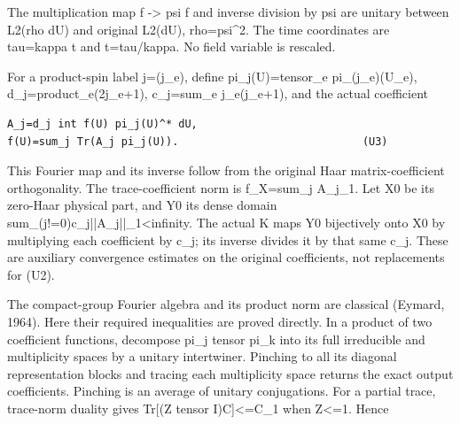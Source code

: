 \documentclass[11pt,a4paper]{article}
\renewcommand{\[}{\begingroup\small\originaldisplaystart}
\renewcommand{\]}{\originaldisplayend\endgroup}
\begin{document}
The multiplication map f -\textgreater{} psi f and inverse division by
psi are unitary between L2(rho dU) and original L2(dU), rho=psi\^{}2.
The time coordinates are tau=kappa t and t=tau/kappa. No field variable
is rescaled.

For a product-spin label j=(j\_e), define pi\_j(U)=tensor\_e
pi\_(j\_e)(U\_e),
{d\allowbreak{}\_\allowbreak{}j\allowbreak{}=\allowbreak{}p\allowbreak{}r\allowbreak{}o\allowbreak{}d\allowbreak{}u\allowbreak{}c\allowbreak{}t\allowbreak{}\_\allowbreak{}e\allowbreak{}(\allowbreak{}2\allowbreak{}j\allowbreak{}\_\allowbreak{}e\allowbreak{}+\allowbreak{}1\allowbreak{})\allowbreak{},\allowbreak{}}
c\_j=sum\_e j\_e(j\_e+1), and the actual coefficient

\begin{verbatim}
A_j=d_j int f(U) pi_j(U)^* dU,
f(U)=sum_j Tr(A_j pi_j(U)).                             (U3)
\end{verbatim}

This Fourier map and its inverse follow from the original Haar
matrix-coefficient orthogonality. The trace-coefficient norm is
\textbar\textbar f\textbar\textbar\_X=sum\_j
\textbar\textbar A\_j\textbar\textbar\_1. Let X0 be its zero-Haar
physical part, and Y0 its dense domain
{s\allowbreak{}u\allowbreak{}m\allowbreak{}\_\allowbreak{}(\allowbreak{}j\allowbreak{}!\allowbreak{}=\allowbreak{}0\allowbreak{})\allowbreak{}c\allowbreak{}\_\allowbreak{}j\allowbreak{}|\allowbreak{}|\allowbreak{}A\allowbreak{}\_\allowbreak{}j\allowbreak{}|\allowbreak{}|\allowbreak{}\_\allowbreak{}1\allowbreak{}\textless{}\allowbreak{}i\allowbreak{}n\allowbreak{}f\allowbreak{}i\allowbreak{}n\allowbreak{}i\allowbreak{}t\allowbreak{}y\allowbreak{}.\allowbreak{}}
The actual K maps Y0 bijectively onto X0 by multiplying each coefficient
by c\_j; its inverse divides it by that same c\_j. These are auxiliary
convergence estimates on the original coefficients, not replacements for
(U2).

The compact-group Fourier algebra and its product norm are classical
(Eymard, 1964). Here their required inequalities are proved directly. In
a product of two coefficient functions, decompose pi\_j tensor pi\_k
into its full irreducible and multiplicity spaces by a unitary
intertwiner. Pinching to all its diagonal representation blocks and
tracing each multiplicity space returns the exact output coefficients.
Pinching is an average of unitary conjugations. For a partial trace,
trace-norm duality gives \textbar Tr{[}(Z tensor
I)C{]}\textbar\textless=\textbar\textbar C\textbar\textbar\_1 when
\textbar\textbar Z\textbar\textbar\textless=1. Hence
\end{document}
